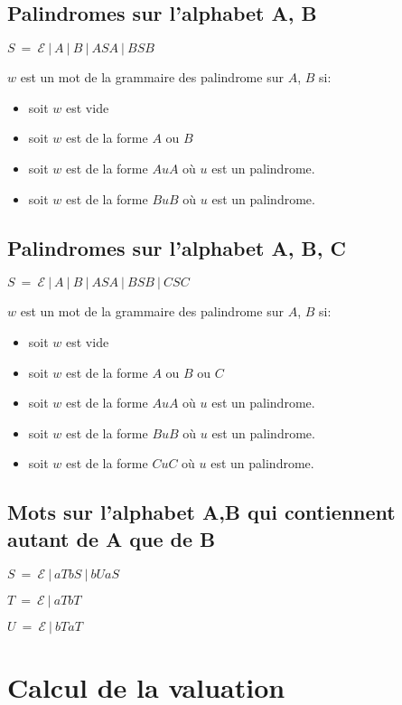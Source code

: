 \documentclass[a4paper, titlepage]{article}
\begin{document}
\subsection{Palindromes sur l'alphabet A, B}
\medskip
$ S\ =\ \mathcal{E}\ |\ A\ |\ B\ |\ ASA\ |\ BSB $

$w$ est un mot de la grammaire des palindrome sur $A$, $B$ si:
\begin{itemize}
\item soit $w$ est vide
\item soit $w$ est de la forme $A$ ou $B$
\item soit $w$ est de la forme $AuA$ où $u$ est un palindrome.
\item soit $w$ est de la forme $BuB$ où $u$ est un palindrome.
\end{itemize}

\subsection{Palindromes sur l'alphabet A, B, C}
\medskip
$ S\ =\ \mathcal{E}\ |\ A\ |\ B\ |\ ASA\ |\ BSB\ |\ CSC$

$w$ est un mot de la grammaire des palindrome sur $A$, $B$ si:
\begin{itemize}
\item soit $w$ est vide
\item soit $w$ est de la forme $A$ ou $B$ ou $C$
\item soit $w$ est de la forme $AuA$ où $u$ est un palindrome.
\item soit $w$ est de la forme $BuB$ où $u$ est un palindrome.
\item soit $w$ est de la forme $CuC$ où $u$ est un palindrome.
\end{itemize}

\subsection{Mots sur l'alphabet A,B qui contiennent autant de A que de
B}
\medskip
$ S\ =\ \mathcal{E}\ |\ aTbS\ |\ bUaS$

$ T\ =\ \mathcal{E}\ |\ aTbT$

$ U\ =\ \mathcal{E}\ |\ bTaT$


\section{Calcul de la valuation}
\end{document}
